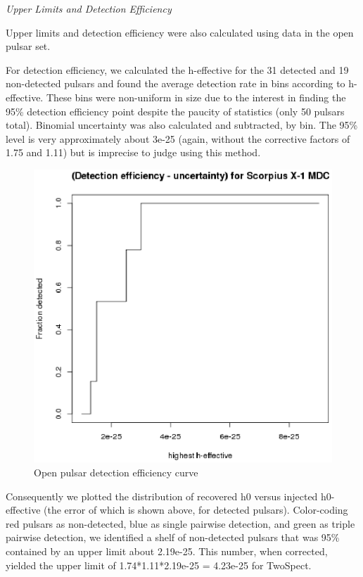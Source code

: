 \textit{Upper Limits and Detection Efficiency}

Upper limits and detection efficiency were also calculated using data in the open pulsar set.

For detection efficiency, we calculated the h-effective for the 31 detected and 19 non-detected pulsars and found the average detection rate in bins according to h-effective. These bins were non-uniform in size due to the interest in finding the 95\% detection efficiency point despite the paucity of statistics (only 50 pulsars total). Binomial uncertainty was also calculated and subtracted, by bin. The 95\% level is very approximately about 3e-25 (again, without the corrective factors of 1.75 and 1.11) but is imprecise to judge using this method.

\begin{figure}
\begin{center}
\includegraphics[width=0.3\paperwidth,height=0.2\paperheight]{detectionVsHeffective.eps}
\caption{ Open pulsar detection efficiency curve
}
\end{center}
\end{figure}


Consequently we plotted the distribution of recovered h0 versus injected h0-effective (the error of which is shown above, for detected pulsars). Color-coding red pulsars as non-detected, blue as single pairwise detection, and green as triple pairwise detection, we identified a shelf of non-detected pulsars that was 95\% contained by an upper limit about 2.19e-25. This number, when corrected, yielded the upper limit of 1.74*1.11*2.19e-25 = 4.23e-25 for TwoSpect.

